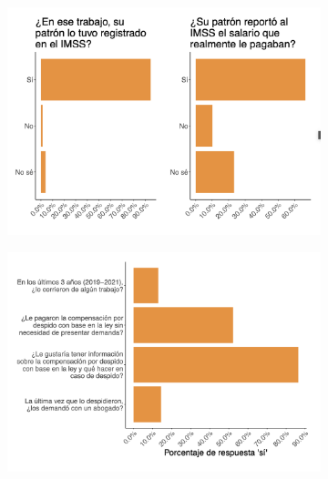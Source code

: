 \documentclass[oneside,11pt]{article}
\begin{document}
\begin{figure}[H]
\begin{center}
    \begin{subfigure}{0.49\textwidth}
    \includegraphics[width=\textwidth]{04_Figures/worker_survey/Exp_3.png}
    \end{subfigure}
    \begin{subfigure}{0.49\textwidth}
    \includegraphics[width=\textwidth]{04_Figures/worker_survey/Exp_4.png}
    \end{subfigure}
    

\end{center}
\end{figure}
\end{document}

